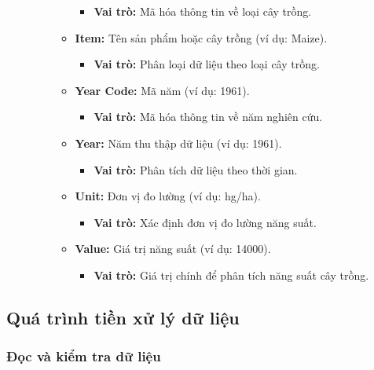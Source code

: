 \begin{description}
\begin{itemize}
\begin{itemize}
            \begin{itemize}
                \item \textbf{Vai trò:} Mã hóa thông tin về loại cây trồng.
            \end{itemize}
            \item \textbf{Item:} Tên sản phẩm hoặc cây trồng (ví dụ: Maize).
            \begin{itemize}
                \item \textbf{Vai trò:} Phân loại dữ liệu theo loại cây trồng.
            \end{itemize}
            \item \textbf{Year Code:} Mã năm (ví dụ: 1961).
            \begin{itemize}
                \item \textbf{Vai trò:} Mã hóa thông tin về năm nghiên cứu.
            \end{itemize}
            \item \textbf{Year:} Năm thu thập dữ liệu (ví dụ: 1961).
            \begin{itemize}
                \item \textbf{Vai trò:} Phân tích dữ liệu theo thời gian.
            \end{itemize}
            \item \textbf{Unit:} Đơn vị đo lường (ví dụ: hg/ha).
            \begin{itemize}
                \item \textbf{Vai trò:} Xác định đơn vị đo lường năng suất.
            \end{itemize}
            \item \textbf{Value:} Giá trị năng suất (ví dụ: 14000).
            \begin{itemize}
                \item \textbf{Vai trò:} Giá trị chính để phân tích năng suất cây trồng.
            \end{itemize}
        \end{itemize}
    \end{itemize}
\end{description}

\subsection{Quá trình tiền xử lý dữ liệu}

\subsubsection{Đọc và kiểm tra dữ liệu}

